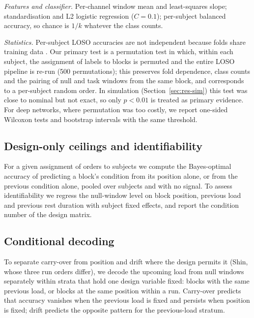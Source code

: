 \documentclass[preprint,11pt]{elsarticle}
\begin{document}
\emph{Features and classifier.} Per-channel window mean and least-squares slope; standardisation and L2 logistic regression ($C=0.1$); per-subject balanced accuracy, so chance is $1/k$ whatever the class counts.

\emph{Statistics.} Per-subject LOSO accuracies are not independent because folds share training data \citep{varoquaux2018}. Our primary test is a permutation test \citep{ojala2010} in which, within each subject, the assignment of labels to blocks is permuted and the entire LOSO pipeline is re-run (500 permutations); this preserves fold dependence, class counts and the pairing of null and task windows from the same block, and corresponds to a per-subject random order. In simulation (Section~\ref{sec:res-sim}) this test was close to nominal but not exact, so only $p<0.01$ is treated as primary evidence. For deep networks, where permutation was too costly, we report one-sided Wilcoxon tests and bootstrap intervals with the same threshold.

\subsection{Design-only ceilings and identifiability}
For a given assignment of orders to subjects we compute the Bayes-optimal accuracy of predicting a block's condition from its position alone, or from the previous condition alone, pooled over subjects and with no signal. To assess identifiability we regress the null-window level on block position, previous load and previous rest duration with subject fixed effects, and report the condition number of the design matrix.

\subsection{Conditional decoding}
\label{sec:conditional}
To separate carry-over from position and drift where the design permits it (Shin, whose three run orders differ), we decode the upcoming load from null windows separately within strata that hold one design variable fixed: blocks with the same previous load, or blocks at the same position within a run. Carry-over predicts that accuracy vanishes when the previous load is fixed and persists when position is fixed; drift predicts the opposite pattern for the previous-load stratum.
\end{document}
